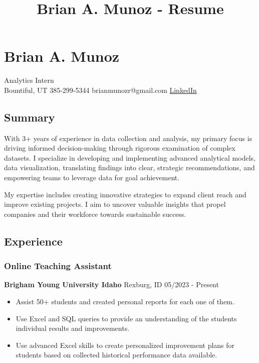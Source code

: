 \documentclass[
  letterpaper,
  DIV=11,
  numbers=noendperiod]{scrartcl}
\title{Brian A. Munoz - Resume}
\author{}
\date{}
\providecommand{\tightlist}{%
  \setlength{\itemsep}{0pt}\setlength{\parskip}{0pt}}\usepackage{longtable,booktabs,array}
\begin{document}
\maketitle

\section{Brian A. Munoz}\label{brian-a.-munoz}

Analytics Intern\\
Bountiful, UT \textbar{} 385-299-5344 \textbar{} brianmunozr@gmail.com
\textbar{} \href{www.linkedin.com/in/brian-mr}{LinkedIn}

\subsection{Summary}\label{summary}

With 3+ years of experience in data collection and analysis, my primary
focus is driving informed decision-making through rigorous examination
of complex datasets. I specialize in developing and implementing
advanced analytical models, data visualization, translating findings
into clear, strategic recommendations, and empowering teams to leverage
data for goal achievement.

My expertise includes creating innovative strategies to expand client
reach and improve existing projects. I aim to uncover valuable insights
that propel companies and their workforce towards sustainable success.

\subsection{Experience}\label{experience}

\subsubsection{Online Teaching
Assistant}\label{online-teaching-assistant}

\textbf{Brigham Young University Idaho} \textbar{} Rexburg, ID
\textbar{} 05/2023 - Present

\begin{itemize}
\tightlist
\item
  Assist 50+ students and created personal reports for each one of them.
\item
  Use Excel and SQL queries to provide an understanding of the students
  individual results and improvements.
\item
  Use advanced Excel skills to create personalized improvement plans for
  students based on collected historical performance data available.
\end{itemize}
\end{document}

